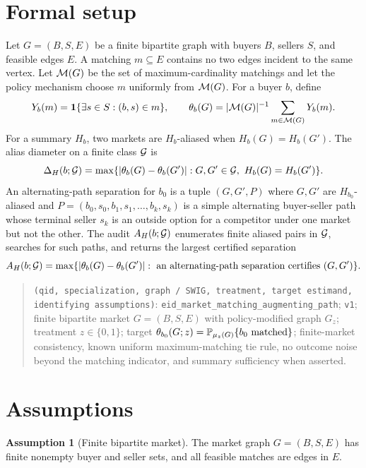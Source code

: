 \documentclass[11pt]{article}
\renewcommand{\Pr}{\mathbb{P}}
\newcommand{\one}{\mathbf{1}}
\theoremstyle{definition}
\newtheorem{assumption}{Assumption}
\theoremstyle{plain}
\theoremstyle{remark}
\begin{document}
\section{Formal setup}
Let \(G=(B,S,E)\) be a finite bipartite graph with buyers \(B\), sellers \(S\), and feasible edges \(E\).  A matching \(m\subseteq E\) contains no two edges incident to the same vertex.  Let \({\cal M}(G)\) be the set of maximum-cardinality matchings and let the policy mechanism choose \(m\) uniformly from \({\cal M}(G)\).  For a buyer \(b\), define
\[
Y_b(m)=\one\{\exists s\in S:(b,s)\in m\},\qquad
\theta_b(G)=|{\cal M}(G)|^{-1}\sum_{m\in{\cal M}(G)}Y_b(m).
\]
For a summary \(H_b\), two markets are \(H_b\)-aliased when \(H_b(G)=H_b(G')\).  The alias diameter on a finite class \({\cal G}\) is
\[
\Delta_H(b;{\cal G})=\max\{|\theta_b(G)-\theta_b(G')|:G,G'\in{\cal G},\ H_b(G)=H_b(G')\}.
\]
An alternating-path separation for \(b_0\) is a tuple \((G,G',P)\) where \(G,G'\) are \(H_{b_0}\)-aliased and \(P=(b_0,s_0,b_1,s_1,\ldots,b_k,s_k)\) is a simple alternating buyer-seller path whose terminal seller \(s_k\) is an outside option for a competitor under one market but not the other.  The audit \(A_H(b;{\cal G})\) enumerates finite aliased pairs in \({\cal G}\), searches for such paths, and returns the largest certified separation
\[
A_H(b;{\cal G})=\max\{|\theta_b(G)-\theta_b(G')|:\hbox{ an alternating-path separation certifies }(G,G')\}.
\]

\begin{quote}
\texttt{(qid, specialization, graph / SWIG, treatment, target estimand, identifying assumptions)}:
\texttt{eid\_market\_matching\_augmenting\_path};
\texttt{v1};
finite bipartite market \(G=(B,S,E)\) with policy-modified graph \(G_z\);
treatment \(z\in\{0,1\}\);
target \(\theta_{b_0}(G;z)=\Pr_{\mu_z(G)}\{b_0\hbox{ matched}\}\);
finite-market consistency, known uniform maximum-matching tie rule, no outcome noise beyond the matching indicator, and summary sufficiency when asserted.
\end{quote}

\section{Assumptions}
\begin{assumption}[Finite bipartite market]\label{assump:finite}
The market graph \(G=(B,S,E)\) has finite nonempty buyer and seller sets, and all feasible matches are edges in \(E\).
\end{assumption}
\end{document}
